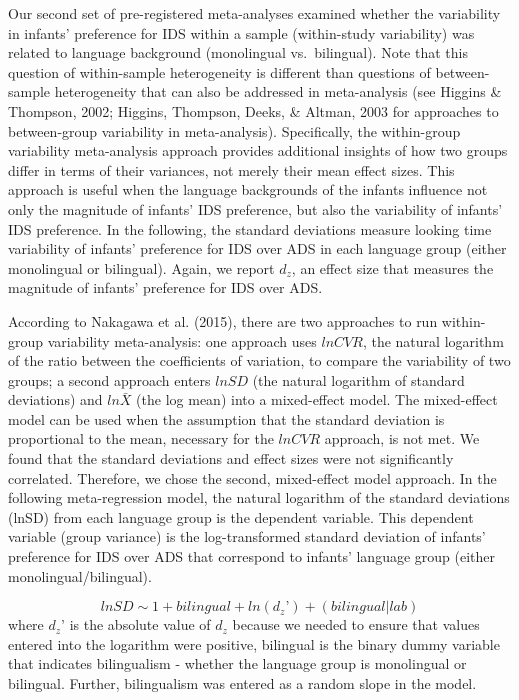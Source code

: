 \documentclass[english,,man,floatsintext]{apa6}
\begin{document}
Our second set of pre-registered meta-analyses examined whether the variability in infants' preference for IDS within a sample (within-study variability) was related to language background (monolingual vs.~bilingual). Note that this question of within-sample heterogeneity is different than questions of between-sample heterogeneity that can also be addressed in meta-analysis (see Higgins \& Thompson, 2002; Higgins, Thompson, Deeks, \& Altman, 2003 for approaches to between-group variability in meta-analysis). Specifically, the within-group variability meta-analysis approach provides additional insights of how two groups differ in terms of their variances, not merely their mean effect sizes. This approach is useful when the language backgrounds of the infants influence not only the magnitude of infants' IDS preference, but also the variability of infants' IDS preference. In the following, the standard deviations measure looking time variability of infants' preference for IDS over ADS in each language group (either monolingual or bilingual). Again, we report \(d_z\), an effect size that measures the magnitude of infants' preference for IDS over ADS.

According to Nakagawa et al. (2015), there are two approaches to run within-group variability meta-analysis: one approach uses \(lnCVR\), the natural logarithm of the ratio between the coefficients of variation, to compare the variability of two groups; a second approach enters \(lnSD\) (the natural logarithm of standard deviations) and \(ln\bar{X}\) (the log mean) into a mixed-effect model. The mixed-effect model can be used when the assumption that the standard deviation is proportional to the mean, necessary for the \(lnCVR\) approach, is not met. We found that the standard deviations and effect sizes were not significantly correlated. Therefore, we chose the second, mixed-effect model approach. In the following meta-regression model, the natural logarithm of the standard deviations (lnSD) from each language group is the dependent variable. This dependent variable (group variance) is the log-transformed standard deviation of infants' preference for IDS over ADS that correspond to infants' language group (either monolingual/bilingual).

\[lnSD \sim 1 + bilingual + ln(d_z’) + (bilingual | lab)\]
where \(d_z’\) is the absolute value of \(d_z\) because we needed to ensure that values entered into the logarithm were positive, bilingual is the binary dummy variable that indicates bilingualism - whether the language group is monolingual or bilingual. Further, bilingualism was entered as a random slope in the model.
\end{document}
